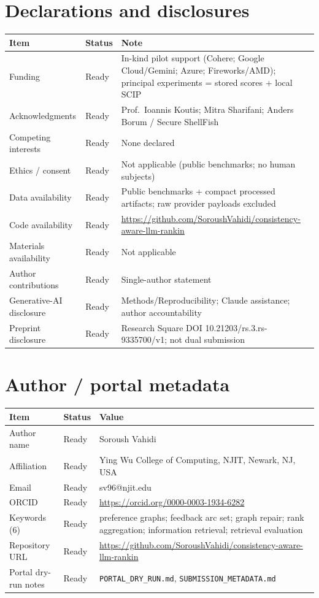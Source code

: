 \documentclass[10pt]{article}
\begin{document}
\section*{Declarations and disclosures}
\begin{longtable}{@{}L{4.2cm}C{1.6cm}L{8.5cm}@{}}
\toprule
\textbf{Item} & \textbf{Status} & \textbf{Note} \\
\midrule
\endhead
Funding & Ready & In-kind pilot support (Cohere; Google Cloud/Gemini; Azure; Fireworks/AMD); principal experiments = stored scores + local SCIP \\
Acknowledgments & Ready & Prof.\ Ioannis Koutis; Mitra Sharifani; Anders Borum / Secure ShellFish \\
Competing interests & Ready & None declared \\
Ethics / consent & Ready & Not applicable (public benchmarks; no human subjects) \\
Data availability & Ready & Public benchmarks + compact processed artifacts; raw provider payloads excluded \\
Code availability & Ready & \url{https://github.com/SoroushVahidi/consistency-aware-llm-rankin} \\
Materials availability & Ready & Not applicable \\
Author contributions & Ready & Single-author statement \\
Generative-AI disclosure & Ready & Methods/Reproducibility; Claude assistance; author accountability \\
Preprint disclosure & Ready & Research Square DOI 10.21203/rs.3.rs-9335700/v1; not dual submission \\
\bottomrule
\end{longtable}

\section*{Author / portal metadata}
\begin{longtable}{@{}L{4.2cm}C{1.6cm}L{8.5cm}@{}}
\toprule
\textbf{Item} & \textbf{Status} & \textbf{Value} \\
\midrule
\endhead
Author name & Ready & Soroush Vahidi \\
Affiliation & Ready & Ying Wu College of Computing, NJIT, Newark, NJ, USA \\
Email & Ready & sv96@njit.edu \\
ORCID & Ready & \url{https://orcid.org/0000-0003-1934-6282} \\
Keywords (6) & Ready & preference graphs; feedback arc set; graph repair; rank aggregation; information retrieval; retrieval evaluation \\
Repository URL & Ready & \url{https://github.com/SoroushVahidi/consistency-aware-llm-rankin} \\
Portal dry-run notes & Ready & \texttt{PORTAL\_DRY\_RUN.md}, \texttt{SUBMISSION\_METADATA.md} \\
\bottomrule
\end{longtable}
\end{document}
